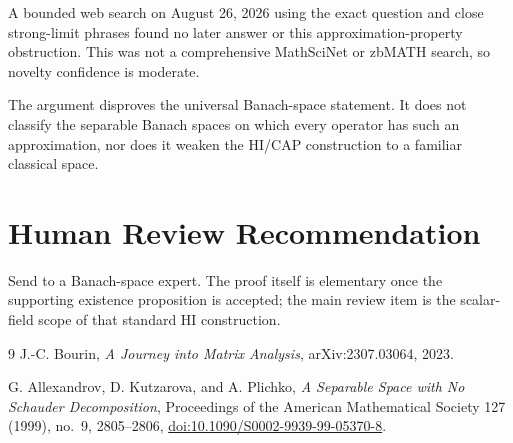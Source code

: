 \documentclass[11pt]{article}
\begin{document}
A bounded web search on August 26, 2026 using the exact question and close
strong-limit phrases found no later answer or this approximation-property
obstruction.  This was not a comprehensive MathSciNet or zbMATH search, so
novelty confidence is moderate.

The argument disproves the universal Banach-space statement.  It does not
classify the separable Banach spaces on which every operator has such an
approximation, nor does it weaken the HI/CAP construction to a familiar
classical space.

\section*{Human Review Recommendation}

Send to a Banach-space expert.  The proof itself is elementary once the
supporting existence proposition is accepted; the main review item is the
scalar-field scope of that standard HI construction.

\begin{thebibliography}{9}
J.-C. Bourin,
\emph{A Journey into Matrix Analysis},
arXiv:2307.03064, 2023.

G. Allexandrov, D. Kutzarova, and A. Plichko,
\emph{A Separable Space with No Schauder Decomposition},
Proceedings of the American Mathematical Society 127 (1999), no.~9,
2805--2806,
\href{https://doi.org/10.1090/S0002-9939-99-05370-8}{doi:10.1090/S0002-9939-99-05370-8}.
\end{thebibliography}
\end{document}
